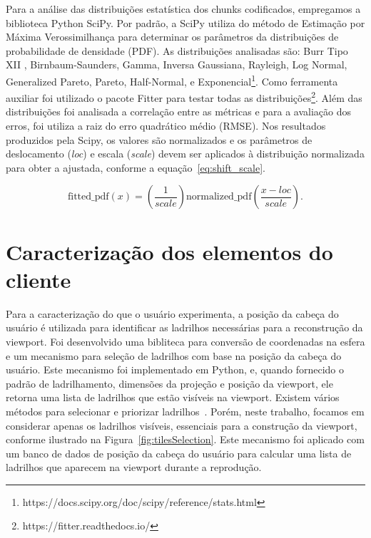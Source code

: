 Para a análise das distribuições estatística dos chunks codificados, empregamos a biblioteca Python SciPy. Por padrão, a SciPy utiliza do método de Estimação por Máxima Verossimilhança para determinar os parâmetros da distribuições de probabilidade de densidade (PDF). As distribuições analisadas são: Burr Tipo XII , Birnbaum-Saunders, Gamma, Inversa Gaussiana, Rayleigh, Log Normal, Generalized Pareto, Pareto, Half-Normal, e Exponencial\footnote{https://docs.scipy.org/doc/scipy/reference/stats.html}. Como ferramenta auxiliar foi utilizado o pacote Fitter para testar todas as distribuições\footnote{https://fitter.readthedocs.io/}. Além das distribuições foi analisada a correlação entre as métricas e para a avaliação dos erros, foi utiliza a raiz do erro quadrático médio (RMSE). Nos resultados produzidos pela Scipy, os valores são normalizados e os parâmetros de deslocamento ({\it loc}) e escala ({\it scale}) devem ser aplicados à distribuição normalizada para obter a ajustada, conforme a equação~\ref{eq:shift_scale}.

\begin{equation}
\label{eq:shift_scale}
\text{fitted\_pdf}(x) = \left( \frac{1}{scale} \right) \text{normalized\_pdf}\left(\frac{x-loc}{scale}\right).
\end{equation}


\section{Caracterização dos elementos do cliente}

Para a caracterização do que o usuário experimenta, a posição da cabeça do usuário é utilizada para identificar as ladrilhos necessárias para a reconstrução da viewport. Foi desenvolvido uma bibliteca para conversão de coordenadas na esfera e um mecanismo para seleção de ladrilhos com base na posição da cabeça do usuário. Este mecanismo foi implementado em Python, e, quando fornecido o padrão de ladrilhamento, dimensões da projeção e posição da viewport, ele retorna uma lista de ladrilhos que estão visíveis na viewport. Existem vários métodos para selecionar e priorizar ladrilhos~\cite{Nguyen2020}. Porém, neste trabalho, focamos em considerar apenas os ladrilhos visíveis, essenciais para a construção da viewport, conforme ilustrado na Figura~\ref{fig:tilesSelection}. Este mecanismo foi aplicado com um banco de dados de posição da cabeça do usuário para calcular uma lista de ladrilhos que aparecem na viewport durante a reprodução.

